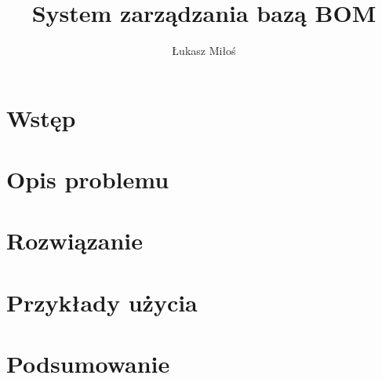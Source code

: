 \documentclass[12pt,twoside]{article}
\author{Łukasz Miłoś}
\title{System zarządzania bazą BOM}
\begin{document}
\maketitle
\blankpage

\tableofcontents
\clearpage
\blankpage

\section{Wstęp}

\section{Opis problemu}

\section{Rozwiązanie}

\section{Przykłady użycia}

\section{Podsumowanie}

\begin{thebibliography}{8}
\label{sec:bibliography}
\end{thebibliography}
\clearpage
\end{document}
